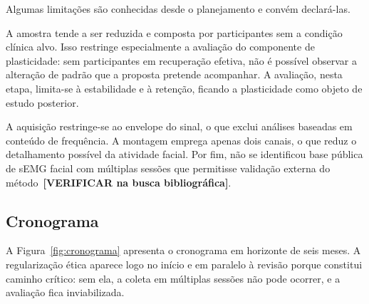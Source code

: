Algumas limitações são conhecidas desde o planejamento e convém
declará-las.

A amostra tende a ser reduzida e composta por participantes sem a
condição clínica alvo. Isso restringe especialmente a avaliação do
componente de plasticidade: sem participantes em recuperação efetiva,
não é possível observar a alteração de padrão que a proposta pretende
acompanhar. A avaliação, nesta etapa, limita-se à estabilidade e à
retenção, ficando a plasticidade como objeto de estudo posterior.

A aquisição restringe-se ao envelope do sinal, o que exclui análises
baseadas em conteúdo de frequência. A montagem emprega apenas dois
canais, o que reduz o detalhamento possível da atividade facial. Por
fim, não se identificou base pública de sEMG facial com múltiplas
sessões que permitisse validação externa do
método~\textbf{[VERIFICAR na busca bibliográfica]}.

\subsection{Cronograma}

A Figura~\ref{fig:cronograma} apresenta o cronograma em horizonte de
seis meses. A regularização ética aparece logo no início e em paralelo
à revisão porque constitui caminho crítico: sem ela, a coleta em
múltiplas sessões não pode ocorrer, e a avaliação fica inviabilizada.

